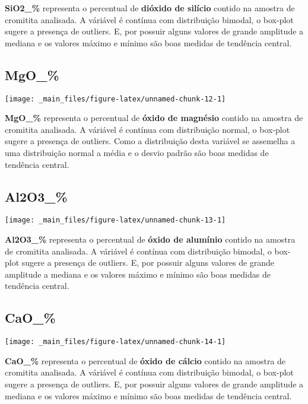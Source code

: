 \documentclass[
]{article}
\begin{document}
\textbf{SiO2\_\%} representa o percentual de \textbf{dióxido de silício} contido na amostra de cromitita analisada. A váriável é contínua com distribuição bimodal, o box-plot sugere a presença de outliers. E, por possuir alguns valores de grande amplitude a mediana e os valores máximo e mínimo são boas medidas de tendência central.

\hypertarget{mgo_}{%
\subsection{MgO\_\%}\label{mgo_}}

\begin{center}\texttt{[image: \_main\_files/figure-latex/unnamed-chunk-12-1]} \end{center}

\textbf{MgO\_\%} representa o percentual de \textbf{óxido de magnésio} contido na amostra de cromitita analisada. A váriável é contínua com distribuição normal, o box-plot sugere a presença de outliers. Como a distribuição desta variável se assemelha a uma distribuição normal a média e o desvio padrão são boas medidas de tendência central.

\hypertarget{al2o3_}{%
\subsection{Al2O3\_\%}\label{al2o3_}}

\begin{center}\texttt{[image: \_main\_files/figure-latex/unnamed-chunk-13-1]} \end{center}

\textbf{Al2O3\_\%} representa o percentual de \textbf{óxido de alumínio} contido na amostra de cromitita analisada. A váriável é contínua com distribuição bimodal, o box-plot sugere a presença de outliers. E, por possuir alguns valores de grande amplitude a mediana e os valores máximo e mínimo são boas medidas de tendência central.

\hypertarget{cao_}{%
\subsection{CaO\_\%}\label{cao_}}

\begin{center}\texttt{[image: \_main\_files/figure-latex/unnamed-chunk-14-1]} \end{center}

\textbf{CaO\_\%} representa o percentual de \textbf{óxido de cálcio} contido na amostra de cromitita analisada. A váriável é contínua com distribuição bimodal, o box-plot sugere a presença de outliers. E, por possuir alguns valores de grande amplitude a mediana e os valores máximo e mínimo são boas medidas de tendência central.
\end{document}
